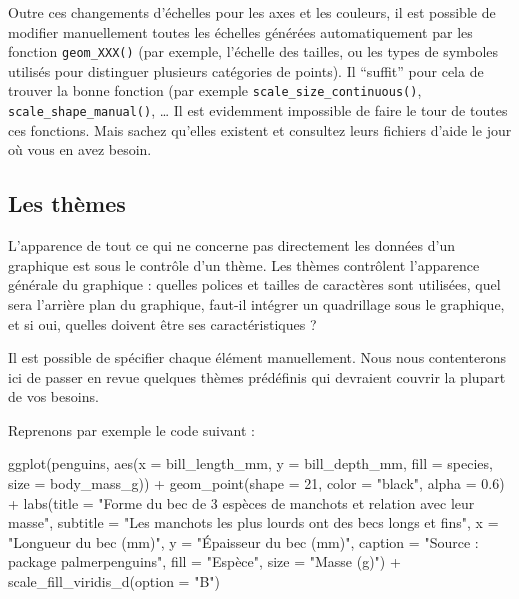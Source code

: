 \documentclass[
  a4paper,
  DIV=11,
  numbers=noendperiod,
  oneside]{scrreprt}
\newenvironment{Shaded}{}{}
\newcommand{\AttributeTok}[1]{\textcolor[rgb]{0.84,0.23,0.29}{#1}}
\newcommand{\DecValTok}[1]{\textcolor[rgb]{0.00,0.36,0.77}{#1}}
\newcommand{\FloatTok}[1]{\textcolor[rgb]{0.00,0.36,0.77}{#1}}
\newcommand{\FunctionTok}[1]{\textcolor[rgb]{0.44,0.26,0.76}{#1}}
\newcommand{\NormalTok}[1]{\textcolor[rgb]{0.14,0.16,0.18}{#1}}
\newcommand{\SpecialCharTok}[1]{\textcolor[rgb]{0.00,0.36,0.77}{#1}}
\newcommand{\StringTok}[1]{\textcolor[rgb]{0.01,0.18,0.38}{#1}}
\begin{document}
Outre ces changements d'échelles pour les axes et les couleurs, il est
possible de modifier manuellement toutes les échelles générées
automatiquement par les fonction \texttt{geom\_XXX()} (par exemple,
l'échelle des tailles, ou les types de symboles utilisés pour distinguer
plusieurs catégories de points). Il ``suffit'' pour cela de trouver la
bonne fonction (par exemple \texttt{scale\_size\_continuous()},
\texttt{scale\_shape\_manual()}, \ldots{} Il est evidemment impossible
de faire le tour de toutes ces fonctions. Mais sachez qu'elles existent
et consultez leurs fichiers d'aide le jour où vous en avez besoin.

\subsection{Les thèmes}\label{les-thuxe8mes}

L'apparence de tout ce qui ne concerne pas directement les données d'un
graphique est sous le contrôle d'un thème. Les thèmes contrôlent
l'apparence générale du graphique : quelles polices et tailles de
caractères sont utilisées, quel sera l'arrière plan du graphique,
faut-il intégrer un quadrillage sous le graphique, et si oui, quelles
doivent être ses caractéristiques ?

Il est possible de spécifier chaque élément manuellement. Nous nous
contenterons ici de passer en revue quelques thèmes prédéfinis qui
devraient couvrir la plupart de vos besoins.

Reprenons par exemple le code suivant :

\begin{Shaded}
\begin{Highlighting}[]
\FunctionTok{ggplot}\NormalTok{(penguins, }\FunctionTok{aes}\NormalTok{(}\AttributeTok{x =}\NormalTok{ bill\_length\_mm, }\AttributeTok{y =}\NormalTok{ bill\_depth\_mm,}
                     \AttributeTok{fill =}\NormalTok{ species, }\AttributeTok{size =}\NormalTok{ body\_mass\_g)) }\SpecialCharTok{+}
  \FunctionTok{geom\_point}\NormalTok{(}\AttributeTok{shape =} \DecValTok{21}\NormalTok{, }\AttributeTok{color =} \StringTok{"black"}\NormalTok{, }\AttributeTok{alpha =} \FloatTok{0.6}\NormalTok{) }\SpecialCharTok{+}
  \FunctionTok{labs}\NormalTok{(}\AttributeTok{title =} \StringTok{"Forme du bec de 3 espèces de manchots et relation avec leur masse"}\NormalTok{,}
       \AttributeTok{subtitle =} \StringTok{"Les manchots les plus lourds ont des becs longs et fins"}\NormalTok{,}
       \AttributeTok{x =} \StringTok{"Longueur du bec (mm)"}\NormalTok{,}
       \AttributeTok{y =} \StringTok{"Épaisseur du bec (mm)"}\NormalTok{,}
       \AttributeTok{caption =} \StringTok{"Source :  package \textquotesingle{}palmerpenguins\textquotesingle{}"}\NormalTok{,}
       \AttributeTok{fill =} \StringTok{"Espèce"}\NormalTok{,}
       \AttributeTok{size =} \StringTok{"Masse (g)"}\NormalTok{) }\SpecialCharTok{+}
  \FunctionTok{scale\_fill\_viridis\_d}\NormalTok{(}\AttributeTok{option =} \StringTok{"B"}\NormalTok{)}
\end{Highlighting}
\end{Shaded}
\end{document}
